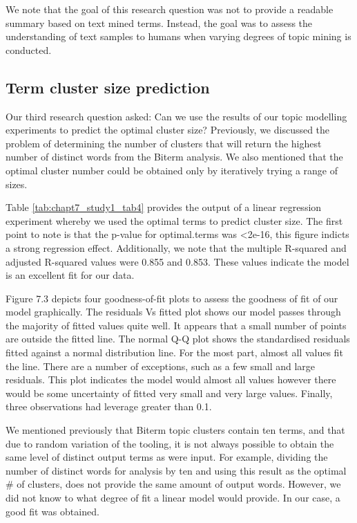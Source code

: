 We note that the goal of this research question was not to provide a readable summary based on text mined terms. Instead, the goal was to assess the understanding of text samples to humans when varying degrees of topic mining is conducted. 

\subsection{Term cluster size prediction}

Our third research question asked: Can we use the results of our topic modelling experiments to predict the optimal cluster size? Previously, we discussed the problem of determining the number of clusters that will return the highest number of distinct words from the Biterm analysis. We also mentioned that the optimal cluster number could be obtained only by iteratively trying a range of sizes.

Table \ref{tab:chapt7_study1_tab4} provides the output of a linear regression experiment whereby we used the optimal terms to predict cluster size. The first point to note is that the p-value for optimal.terms was \textless2e-16, this figure indicts a strong regression effect. Additionally, we note that the multiple R-squared and adjusted R-squared values were 0.855 and 0.853. These values indicate the model is an excellent fit for our data.

Figure 7.3 depicts four goodness-of-fit plots to assess the goodness of fit of our model graphically. The residuals Vs fitted plot shows our model passes through the majority of fitted values quite well. It appears that a small number of points are outside the fitted line. The normal Q-Q plot shows the standardised residuals fitted against a normal distribution line. For the most part, almost all values fit the line. There are a number of exceptions, such as a few small and large residuals. This plot indicates the model would almost all values however there would be some uncertainty of fitted very small and very large values. Finally, three observations had leverage greater than 0.1.  

We mentioned previously that Biterm topic clusters contain ten terms, and that due to random variation of the tooling, it is not always possible to obtain the same level of distinct output terms as were input. For example, dividing the number of distinct words for analysis by ten and using this result as the optimal \# of clusters, does not provide the same amount of output words. However, we did not know to what degree of fit a linear model would provide. In our case, a good fit was obtained.

